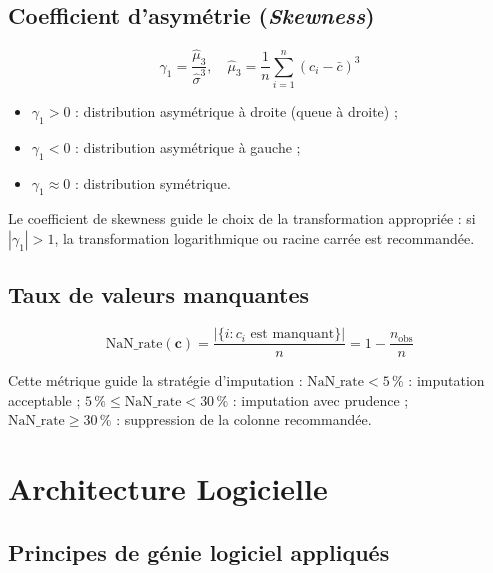 \documentclass[12pt,a4paper]{article}
\begin{document}
\subsection{Coefficient d'asymétrie (\textit{Skewness})}

\begin{equation}
  \gamma_1 = \frac{\hat{\mu}_3}{\hat{\sigma}^3},
  \quad \hat{\mu}_3 = \frac{1}{n}\sum_{i=1}^n (c_i - \bar{c})^3
\end{equation}

\begin{itemize}
  \item $\gamma_1 > 0$ : distribution asymétrique à droite (queue à droite) ;
  \item $\gamma_1 < 0$ : distribution asymétrique à gauche ;
  \item $\gamma_1 \approx 0$ : distribution symétrique.
\end{itemize}

Le coefficient de skewness guide le choix de la transformation appropriée :
si $|\gamma_1| > 1$, la transformation logarithmique ou racine carrée est recommandée.

\subsection{Taux de valeurs manquantes}

\begin{equation}
  \text{NaN\_rate}(\mathbf{c}) = \frac{|\{i : c_i \text{ est manquant}\}|}{n}
  = 1 - \frac{n_{\text{obs}}}{n}
\end{equation}

Cette métrique guide la stratégie d'imputation :
$\text{NaN\_rate} < 5\,\%$ : imputation acceptable ;
$5\,\% \leq \text{NaN\_rate} < 30\,\%$ : imputation avec prudence ;
$\text{NaN\_rate} \geq 30\,\%$ : suppression de la colonne recommandée.

\section{Architecture Logicielle}

\subsection{Principes de génie logiciel appliqués}
\end{document}
